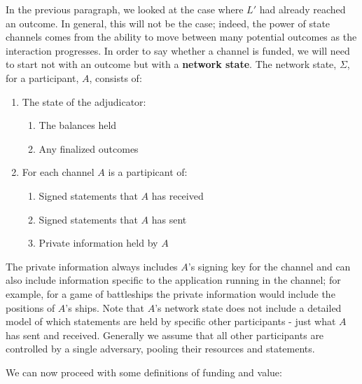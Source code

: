 \begin{figure}[h]\centering
  \makebox[\textwidth][c]{}
  \caption{
  }\label{fig:indirect-funding}
\end{figure}

In the previous paragraph, we looked at the case where $L'$ had already reached an outcome.
In general, this will not be the case;
indeed, the power of state channels comes from the ability to move between many potential outcomes as the interaction progresses.
In order to say whether a channel is funded, we will need to start not with an outcome but with a \textbf{network state}.
The network state, $\Sigma$, for a participant, $A$, consists of:
\begin{enumerate}
  \item The state of the adjudicator: 
  \begin{enumerate}
    \item The balances held
    \item Any finalized outcomes
  \end{enumerate}
  \item For each channel $A$ is a partipicant of:
  \begin{enumerate}
    \item Signed statements that $A$ has received
    \item Signed statements that $A$ has sent
    \item Private information held by $A$
  \end{enumerate}
\end{enumerate}
The private information always includes $A$'s signing key for the channel and can also include information specific to the application running in the channel;
for example, for a game of battleships the private information would include the positions of $A$'s ships.
Note that $A$'s network state does not include a detailed model of which statements are held by specific other participants - just what $A$ has sent and received.
Generally we assume that all other participants are controlled by a single adversary, pooling their resources and statements. 

\begin{figure}[h]\centering
  \makebox[\textwidth][c]{}
  \caption{
  }\label{fig:system-state-direct-funding}
\end{figure}

We can now proceed with some definitions of funding and value:

